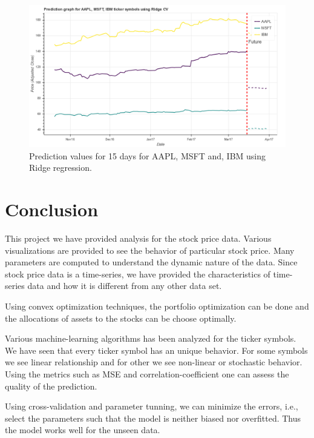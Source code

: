 \documentclass[12pt]{article}
\begin{document}
\begin{figure}[!htbp]
\begin{center}
\includegraphics[height=0.4\textheight,width=\textwidth]{ridge_mdl.png}
\caption{Prediction values for 15 days for AAPL, MSFT and, IBM using Ridge regression.}
\label{fig:ridge_mdl}
\end{center}
\end{figure}


\section{Conclusion}
\label{sec:con}

This project we have provided analysis for the stock price data. Various visualizations are provided to see the behavior of particular stock price. Many parameters are computed to understand the dynamic nature of the data. Since stock price data is a time-series, we have provided the characteristics of time-series data and how it is different from any other data set.

Using convex optimization techniques, the portfolio optimization can be done and the allocations of assets to the stocks can be choose optimally.

Various machine-learning algorithms has been analyzed for the ticker symbols. We have seen that every ticker symbol has an unique behavior. For some symbols we see linear relationship and for other we see non-linear or stochastic behavior. Using the metrics such as MSE and correlation-coefficient  one can assess the quality of the prediction.

Using cross-validation and parameter tunning, we can minimize the errors, i.e., select the parameters such that the model is neither biased nor overfitted. Thus the model works well for the unseen data.
\end{document}
